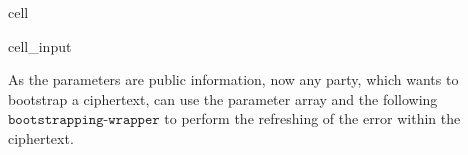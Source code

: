 \documentclass[letterpaper,10pt,english]{jupyterBook}
\begin{document}
\begin{sphinxuseclass}{cell}
\begin{sphinxVerbatimInput}
\begin{sphinxuseclass}{cell_input}
\begin{sphinxVerbatim}[commandchars=\\\{\}]
        
         
               
\end{sphinxVerbatim}

\end{sphinxuseclass}\end{sphinxVerbatimInput}

\end{sphinxuseclass}
\sphinxAtStartPar
As the parameters are public information, now any party, which wants to bootstrap a ciphertext, can use the parameter array and the following \(\texttt{bootstrapping-wrapper}\) to perform the refreshing of the error within the ciphertext.
\end{document}

